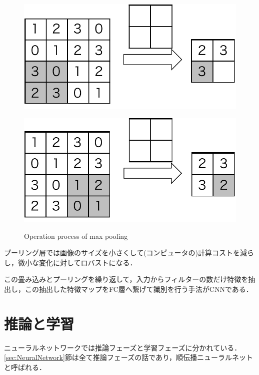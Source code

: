\begin{figure}[H]
\begin{minipage}[b]{0.4\columnwidth}
		\subcaption{}
		\label{fig:pooling_ex2}
	\end{minipage}
	\begin{minipage}[b]{0.4\columnwidth}
		\centering
		\includegraphics[width=\linewidth]{figure/chapter2/pooling_ex3}
		\subcaption{}
		\label{fig:pooling_ex3}
	\end{minipage}
	\hspace{10truemm}
	\begin{minipage}[b]{0.4\columnwidth}
		\centering
		\includegraphics[width=\linewidth]{figure/chapter2/pooling_ex4}
		\subcaption{}
		\label{fig:pooling_ex4}
	\end{minipage}
	\caption{Operation process of max pooling}
	\label{fig:maxpooling}
\end{figure}

プーリング層では画像のサイズを小さくして(コンピュータの)計算コストを減らし，微小な変化に対してロバストになる．

この畳み込みとプーリングを繰り返して，入力からフィルターの数だけ特徴を抽出し，この抽出した特徴マップをFC層へ繋げて識別を行う手法がCNNである．


\section{推論と学習}
ニューラルネットワークでは推論フェーズと学習フェーズに分かれている．\ref{sec:NeuralNetwork}節は全て推論フェーズの話であり，順伝播ニューラルネットと呼ばれる．

